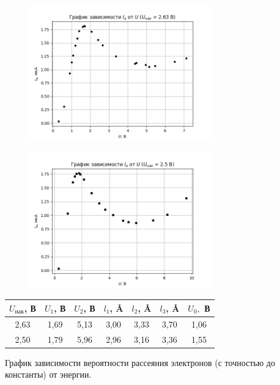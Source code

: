 \documentclass[a4paper,12pt]{article}
\begin{document}
\begin{figure}[H]
\centering
\includegraphics[width = 0.7\textwidth]{graph3.png}
\end{figure}

\begin{figure}[H]
\centering
\includegraphics[width = 0.7\textwidth]{graph4.png}
\end{figure}

\begin{table}[H]
\centering
\begin{tabular}{|c|c|c|c|c|c|c|}
\hline
$U_\text{нак}$, В & $U_1$, В & $U_2$, В & $l_1$, \AA & $l_2$, \AA & $l_3$, \AA & $U_0,$ В \\
\hline
2,63 & 1,69 & 5,13 & 3,00 & 3,33 & 3,70 & 1,06 \\
\hline
2,50 & 1,79 & 5,96 & 2,96 & 3,16 & 3,36 & 1,55 \\
\hline
\end{tabular}
\end{table}

График зависимости вероятности рассеяния электронов (с точностью до константы) от энергии.
\end{document}
